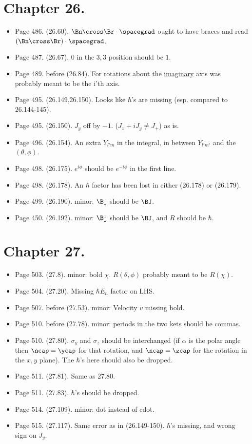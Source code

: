 \section{Chapter 26.}
\begin{itemize}
\item Page 486.  (26.60).  $\Bn \cross \Br \cdot \spacegrad$ ought to have braces and read $(\Bn \cross \Br) \cdot \spacegrad$.
\item Page 487.  (26.67).  $0$ in the $3,3$ position should be $1$.
\item Page 489.  before (26.84).  For rotations about the \underline{imaginary} axis was probably meant to be the i'th axis.
\item Page 495.  (26.149,26.150).  Looks like $\hbar$'s are missing (esp. compared to 26.144-145).
\item Page 495.  (26.150).  $J_y$ off by $-1$. ($J_x + iJ_y \ne J_{+}$) as is.
\item Page 496.  (26.154).  An extra $Y_{l'm}$ in the integral, in between $Y_{l' m'}$ and the $(\theta, \phi)$.
\item Page 498.  (26.175).  $e^{i\phi}$ should be $e^{-i\phi}$ in the first line.
\item Page 498.  (26.178).  An $\hbar$ factor has been lost in either (26.178) or (26.179).
\item Page 499.  (26.190).  minor: $\Bj$ should be $\BJ$.
\item Page 450.  (26.192).  minor: $\Bj$ should be $\BJ$, and $R$ should be $\hbar$.
\end{itemize}

\section{Chapter 27.}
\begin{itemize}
\item Page 503.  (27.8).  minor: bold $\chi$.  $R(\theta, \phi)$ probably meant to be $R(\chi)$.
\item Page 504.  (27.20).  Missing $\hbar E_n$ factor on LHS.
\item Page 507.  before (27.53).  minor: Velocity $v$ missing bold.
\item Page 510.  before (27.78).  minor: periods in the two kets should be commas.
\item Page 510.  (27.80).  $\sigma_y$ and $\sigma_z$ should be interchanged (if $\alpha$ is the polar angle then $\ncap = \ycap$ for that rotation, and $\ncap = \zcap$ for the rotation in the $x,y$ plane).   The $\hbar$'s here should also be dropped.
\item Page 511.  (27.81).  Same as 27.80.
\item Page 511.  (27.83).  $\hbar$'s should be dropped.
\item Page 514.  (27.109).  minor: dot instead of cdot.
\item Page 515.  (27.117).  Same error as in (26.149-150).  $\hbar$'s missing, and wrong sign on $J_y$.
\end{itemize}

